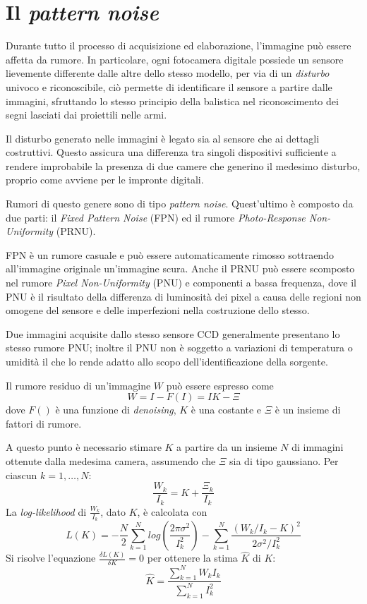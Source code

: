 \section{Il \emph{pattern noise}}

Durante tutto il processo di acquisizione ed elaborazione, l'immagine può essere affetta da rumore. 
In particolare, ogni fotocamera digitale possiede un sensore
lievemente differente dalle altre dello stesso modello, per via di un \emph{disturbo}
univoco e riconoscibile, ciò permette di identificare il sensore a partire dalle
immagini, sfruttando lo stesso principio della balistica nel riconoscimento dei segni lasciati dai proiettili nelle armi.

Il disturbo generato nelle immagini è legato sia al sensore che ai dettagli costruttivi. Questo
assicura una differenza tra singoli dispositivi sufficiente a rendere improbabile
la presenza di due camere che generino il medesimo disturbo, proprio come avviene per le impronte digitali. 

Rumori di questo genere sono di tipo \emph{pattern noise}. Quest'ultimo è composto da due parti: il \emph{Fixed Pattern Noise} (FPN) ed il rumore \emph{Photo-Response Non-Uniformity} (PRNU).

FPN è un rumore casuale e può essere automaticamente rimosso sottraendo all'immagine originale un'immagine scura. Anche il PRNU può essere scomposto nel rumore \emph{Pixel Non-Uniformity} (PNU) e componenti a bassa frequenza, dove il PNU è il risultato della differenza di luminosità dei pixel a causa delle regioni non omogene del sensore e delle imperfezioni nella costruzione dello stesso.

Due immagini acquisite dallo stesso sensore CCD generalmente presentano lo stesso rumore PNU; inoltre il PNU non è soggetto a variazioni di temperatura o umidità il che lo rende adatto allo scopo dell'identificazione della sorgente.

Il rumore residuo di un'immagine $W$ può essere espresso come
$$
W = I - F(I) = IK - \Xi
$$
dove $F()$ è una funzione di \emph{denoising}, $K$ è una costante e $\Xi$ è un insieme di fattori di rumore.

A questo punto è necessario stimare $K$ a partire da un insieme $N$ di immagini ottenute dalla medesima camera, assumendo che $\Xi$ sia di tipo gaussiano. Per ciascun $k = 1, \ldots, N$:
$$
\frac{W_k}{I_k} = K + \frac{\Xi_k}{I_k}
$$
La \emph{log-likelihood} di $\frac{W_k}{I_k}$, dato $K$, è calcolata con
$$
L(K) = -\frac{N}{2} \sum_{k = 1}^{N} log(\frac{2\pi\sigma^2}{I_{k}^{2}}) -  \sum_{k = 1}^{N} \frac{(W_k / I_k - K)^2}{2\sigma^2 / I_{k}^{2}}
$$
Si risolve l'equazione $\frac{\delta L(K)}{\delta K} = 0$ per ottenere la stima $\hat{K}$ di $K$:
$$
\hat{K} = \frac{\sum_{k = 1}^{N} W_k I_k}{\sum_{k = 1}^{N} I_{k}^{2}}
$$

